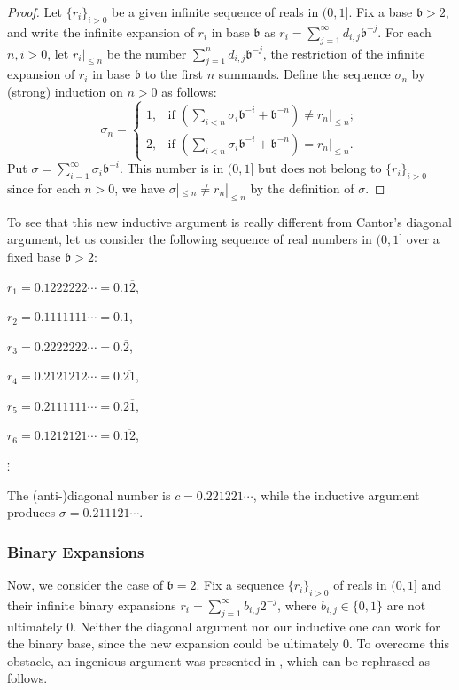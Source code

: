 \documentclass[12pt]{article}
\begin{document}
\begin{proof}

\noindent
 Let $\{r_i\}_{i>0}$ be a given infinite sequence  of reals in $(0,1]$. Fix a base $\mathfrak{b}>2$,
and write the infinite expansion of  $r_i$ in base $\mathfrak{b}$ as $r_i=\sum_{j=1}^{\infty}d_{i,j}\mathfrak{b}^{-j}$.
For each $n,i>0$, let $r_i|_{\leqslant n}$ be the number $\sum_{j=1}^{n}d_{i,j}\mathfrak{b}^{-j}$, the restriction of the infinite expansion of $r_i$ in base $\mathfrak{b}$ to the first $n$ summands.
Define the sequence $\sigma_n$ by (strong) induction on $n>0$ as follows: $$\sigma_n=\begin{cases}
                                  1, & \mbox{if } (\sum_{i<n}\sigma_i\mathfrak{b}^{-i}+
                                  \mathfrak{b}^{-n})
                                  \neq r_n|_{\leqslant n}; \\
                                  2, & \mbox{if } (\sum_{i<n}\sigma_i\mathfrak{b}^{-i}+
                                  \mathfrak{b}^{-n}) = r_n|_{\leqslant n}.
                                \end{cases}$$
Put $\sigma=\sum_{i=1}^{\infty}\sigma_i\mathfrak{b}^{-i}$. This number is in $(0,1]$ but does not belong to $\{r_i\}_{i>0}$ since for each $n>0$, we have $\sigma|_{\leqslant n}\neq r_n|_{\leqslant n}$ by the definition of $\sigma$.
  \end{proof}


To see that this new inductive argument is really different from Cantor's diagonal argument,  let us consider   the following sequence of real numbers in $(0,1]$ over  a fixed base $\mathfrak{b}>2$:

\medskip

\qquad $r_1=0.1222222\cdots=0.1\overline{2}$,

\qquad $r_2=0.1111111\cdots=0.\overline{1}$,

\qquad $r_3=0.2222222\cdots=0.\overline{2}$,

\qquad $r_4=0.2121212\cdots=0.\overline{21}$,

\qquad $r_5=0.2111111\cdots=0.2\overline{1}$,

\qquad $r_6=0.1212121\cdots=0.\overline{12}$,

 \qquad \qquad \qquad $\vdots$

\medskip

\noindent
The (anti-)diagonal number is $c=0.221221\cdots$, while the inductive argument produces $\sigma=0.211121\cdots$.

\subsubsection{Binary Expansions}
Now, we consider the case of $\mathfrak{b}=2$.
Fix a   sequence $\{r_i\}_{i>0}$  of reals in $(0,1]$ and their infinite binary expansions $r_i=\sum_{j=1}^{\infty}b_{i,j}2^{-j}$, where $b_{i,j}\in\{0,1\}$ are not ultimately $0$.
Neither the diagonal argument nor our inductive one can work for  the binary base, since the new expansion could be ultimately $0$. To overcome this obstacle,   an ingenious argument was presented in \textbf{\cite{H10}}, which can be rephrased  as follows.
\end{document}
